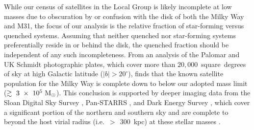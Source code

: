While our census of satellites in the Local Group is likely incomplete
at low masses due to obscuration by or confusion with the disk of both
the Milky Way and M31, the focus of our analysis is the relative
fraction of star-forming versus quenched systems. Assuming that
neither quenched nor star-forming systems preferentially reside in or
behind the disk, the quenched fraction should be independent of any
such incompleteness. From an analysis of the Palomar and UK Schmidt
photographic plates, which cover more than $20,000$~square~degrees of
sky at high Galactic latitude ($|b| > 20^{\circ}$), \citet{irwin94}
finds that the known satellite population for the Milky Way is
complete down to below our adopted mass limit
($\gtrsim~3~\times~10^{5}~{\rm M}_{\odot}$). This conclusion is supported by
deeper imaging data from the Sloan Digital Sky Survey
\citep[SDSS,][]{york00}, Pan-STARRS \citep{kaiser10}, and Dark Energy
Survey \citep[DES,][]{DES14}, which cover a significant portion of the
northern and southern sky and are complete to beyond the host virial
radius (i.e.~$>~\!~300$~kpc) at these stellar masses
\citep{tollerud08, koposov08, laevens14, koposov15, DES15}.



